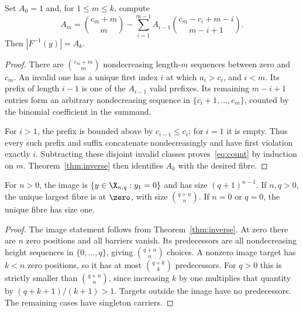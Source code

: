 \begin{theorem}\label{thm:count}
Set $A_0=1$ and, for $1\le m\le k$, compute
\begin{equation}\label{eq:count}
 A_m=\binom{c_m+m}{m}
       -\sum_{i=1}^{m-1}A_{i-1}
                   \binom{c_m-c_i+m-i}{m-i+1}.
\end{equation}
Then $|F^{-1}(y)|=A_k$.
\end{theorem}
\begin{proof}
There are $\binom{c_m+m}{m}$ nondecreasing length-$m$ sequences between
zero and $c_m$. An invalid one has a unique first index $i$ at which
$a_i>c_i$, and $i<m$. Its prefix of length $i-1$ is one of the
$A_{i-1}$ valid prefixes. Its remaining $m-i+1$ entries form an arbitrary
nondecreasing sequence in $\{c_i+1,\ldots,c_m\}$, counted by the
binomial coefficient in the summand.

For $i>1$, the prefix is bounded above by $c_{i-1}\le c_i$; for $i=1$
it is empty. Thus every such prefix and suffix concatenate
nondecreasingly and have first violation exactly $i$. Subtracting these
disjoint invalid classes proves~\eqref{eq:count} by induction on $m$.
Theorem~\ref{thm:inverse} then identifies $A_k$ with the desired fibre.
\end{proof}

\begin{corollary}\label{cor:extreme}
For $n>0$, the image is $\{y\in\X_{n,q}:y_1=0\}$ and has size
$(q+1)^{n-1}$. If $n,q>0$, the unique largest fibre is at $\zero$,
with size $\binom{q+n}{n}$. If $n=0$ or $q=0$, the unique fibre has
size one.
\end{corollary}
\begin{proof}
The image statement follows from Theorem~\ref{thm:inverse}. At zero
there are $n$ zero positions and all barriers vanish. Its predecessors
are all nondecreasing height sequences in $\{0,\ldots,q\}$, giving
$\binom{q+n}{n}$ choices. A nonzero image target has $k<n$ zero
positions, so it has at most $\binom{q+k}{k}$ predecessors. For $q>0$
this is strictly smaller than $\binom{q+n}{n}$, since increasing $k$ by
one multiplies that quantity by $(q+k+1)/(k+1)>1$. Targets outside the
image have no predecessors. The remaining cases have singleton carriers.
\end{proof}

